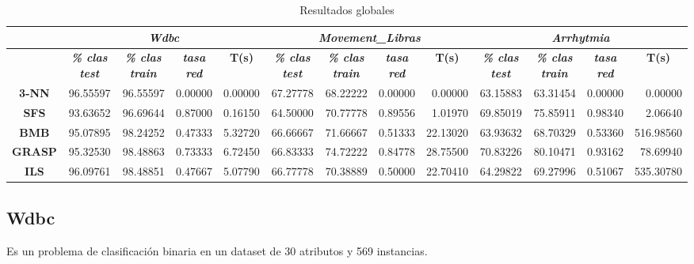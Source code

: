 \documentclass[a4paper,11pt]{article}
\begin{document}
  
  \begin{table}[H]
  \caption{Resultados globales}
  \begin{adjustbox}{width=1.1\textwidth}
  \begin{tabular}{|c|r|r|r|r|r|r|r|r|r|r|r|r|}
  \hline
  \multicolumn{1}{|l|}{} & \multicolumn{ 4}{c|}{\textbf{\textit{Wdbc}}} & \multicolumn{ 4}{c|}{\textbf{\textit{Movement\_Libras}}} & \multicolumn{ 4}{c|}{\textbf{\textit{Arrhytmia}}} \\ \hline
  \multicolumn{1}{|l|}{} & \multicolumn{1}{c|}{\textbf{\textit{\% clas test}}} & \multicolumn{1}{c|}{\textbf{\textit{\% clas train}}} & \multicolumn{1}{c|}{\textbf{\textit{tasa red}}} & \multicolumn{1}{c|}{\textbf{T(s)}} & \multicolumn{1}{c|}{\textbf{\textit{\% clas test}}} & \multicolumn{1}{c|}{\textbf{\textit{\% clas train}}} & \multicolumn{1}{c|}{\textbf{\textit{tasa red}}} & \multicolumn{1}{c|}{\textbf{T(s)}} & \multicolumn{1}{c|}{\textbf{\textit{\% clas test}}} & \multicolumn{1}{c|}{\textbf{\textit{\% clas train}}} & \multicolumn{1}{c|}{\textbf{\textit{tasa red}}} & \multicolumn{1}{c|}{\textbf{T(s)}} \\ \hline
  \textbf{3-NN} & 96.55597 & 96.55597 & 0.00000 & 0.00000 & 67.27778 & 68.22222 & 0.00000 & 0.00000 & 63.15883 & 63.31454 & 0.00000 & 0.00000 \\ \hline
  \textbf{SFS} & 93.63652 & 96.69644 & 0.87000 & 0.16150 & 64.50000 & 70.77778 & 0.89556 & 1.01970 & 69.85019 & 75.85911 & 0.98340 & 2.06640 \\ \hline
  \textbf{BMB} & 95.07895 & 98.24252 & 0.47333 & 5.32720 & 66.66667 & 71.66667 & 0.51333 & 22.13020 & 63.93632 & 68.70329 & 0.53360 & 516.98560 \\ \hline
  \textbf{GRASP} & 95.32530 & 98.48863 & 0.73333 & 6.72450 & 66.83333 & 74.72222 & 0.84778 & 28.75500 & 70.83226 & 80.10471 & 0.93162 & 78.69940 \\ \hline
  \textbf{ILS} & 96.09761 & 98.48851 & 0.47667 & 5.07790 & 66.77778 & 70.38889 & 0.50000 & 22.70410 & 64.29822 & 69.27996 & 0.51067 & 535.30780 \\ \hline
  \end{tabular}
  \end{adjustbox}
  \label{all}
  \end{table}
  
  
  \subsection{Wdbc}
  
  Es un problema de clasificación binaria en un dataset de 30 atributos y 569 instancias.
   
\end{document}
